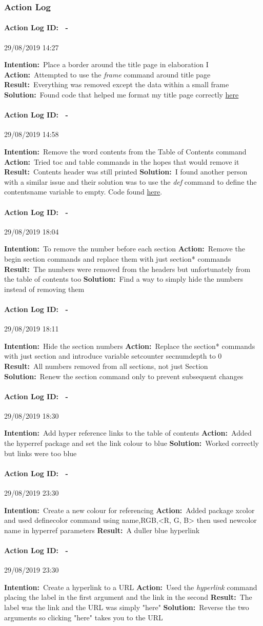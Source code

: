 \documentclass[12pt]{article}
\newcounter{problem} \setcounter{problem}{1}
\newcommand{\actionlog}[1]{\paragraph{Action Log ID: \theproblem\ -}{#1} ~\\ \addtocounter{problem}{1}}
\newcommand{\intention}[1]{\textbf{Intention:}{\textnormal\ #1} \newline}
\newcommand{\action}[1]{\textbf{Action:}{\textnormal\ #1} \newline}
\newcommand{\result}[1]{\textbf{Result:}{\textnormal\ #1} \newline}
\newcommand{\solution}[1]{\textbf{Solution:}{\textnormal\ #1} \newline}
\begin{document}
\subsubsection{Action Log}

\actionlog{29/08/2019 14:27}
\intention{Place a border around the title page in elaboration I}
\action{Attempted to use the \textit{frame} command around title page}
\result{Everything was removed except the data within a small frame}
\solution{Found code that helped me format my title page correctly \hyperlink{https://tex.stackexchange.com/questions/407812/page-border-for-cover-page-in-latex?rq=1}{here}} 

\actionlog{29/08/2019 14:58}
\intention{Remove the word contents from the Table of Contents command}
\action{Tried toc and table commands in the hopes that would remove it}
\result{Contents header was still printed}
\solution{I found another person with a similar issue and their solution was to use the \textit{def} command to define the contentsname variable to empty. Code found \hyperlink{https://latex.org/forum/viewtopic.php?t=8151}{here}.}

\actionlog{29/08/2019 18:04}
\intention{To remove the number before each section}
\action{Remove the begin section commands and replace them with just section* commands}
\result{The numbers were removed from the headers but unfortunately from the table of contents too}
\solution{Find a way to simply hide the numbers instead of removing them}

\actionlog{29/08/2019 18:11}
\intention{Hide the section numbers}
\action{Replace the section* commands with just section and introduce variable setcounter secnumdepth to 0}
\result{All numbers removed from all sections, not just Section}
\solution{Renew the section command only to prevent subsequent changes}

\actionlog{29/08/2019 18:30}
\intention{Add hyper reference links to the table of contents}
\action{Added the hyperref package and set the link colour to blue}
\solution{Worked correctly but links were too blue}

\actionlog{29/08/2019 23:30}
\intention{Create a new colour for referencing}
\action{Added package xcolor and used definecolor command using name,RGB,<R, G, B> then used newcolor name in hyperref parameters}
\result{A duller blue hyperlink}

\actionlog{29/08/2019 23:30}
\intention{Create a hyperlink to a URL}
\action{Used the \textit{hyperlink} command placing the label in the first argument and the link in the second}
\result{The label was the link and the URL was simply "here"}
\solution{Reverse the two arguments so clicking "here" takes you to the URL}
\newpage
\end{document}
